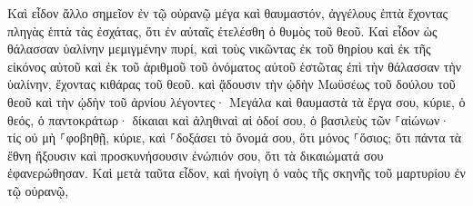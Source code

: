 \documentclass{openreader}
\begin{document}
Καὶ εἶδον ἄλλο σημεῖον ἐν τῷ οὐρανῷ μέγα καὶ θαυμαστόν, ἀγγέλους ἑπτὰ ἔχοντας πληγὰς ἑπτὰ τὰς ἐσχάτας, ὅτι ἐν αὐταῖς ἐτελέσθη ὁ θυμὸς τοῦ θεοῦ. 
Καὶ εἶδον ὡς θάλασσαν ὑαλίνην μεμιγμένην πυρί, καὶ τοὺς νικῶντας ἐκ τοῦ θηρίου καὶ ἐκ τῆς εἰκόνος αὐτοῦ καὶ ἐκ τοῦ ἀριθμοῦ τοῦ ὀνόματος αὐτοῦ ἑστῶτας ἐπὶ τὴν θάλασσαν τὴν ὑαλίνην, ἔχοντας κιθάρας τοῦ θεοῦ. 
καὶ ᾄδουσιν τὴν ᾠδὴν Μωϋσέως τοῦ δούλου τοῦ θεοῦ καὶ τὴν ᾠδὴν τοῦ ἀρνίου λέγοντες· Μεγάλα καὶ θαυμαστὰ τὰ ἔργα σου, κύριε, ὁ θεός, ὁ παντοκράτωρ· δίκαιαι καὶ ἀληθιναὶ αἱ ὁδοί σου, ὁ βασιλεὺς τῶν ⸀αἰώνων· 
τίς οὐ μὴ ⸀φοβηθῇ, κύριε, καὶ ⸀δοξάσει τὸ ὄνομά σου, ὅτι μόνος ⸀ὅσιος; ὅτι πάντα τὰ ἔθνη ἥξουσιν καὶ προσκυνήσουσιν ἐνώπιόν σου, ὅτι τὰ δικαιώματά σου ἐφανερώθησαν. 
Καὶ μετὰ ταῦτα εἶδον, καὶ ἠνοίγη ὁ ναὸς τῆς σκηνῆς τοῦ μαρτυρίου ἐν τῷ οὐρανῷ, 
\end{document}
